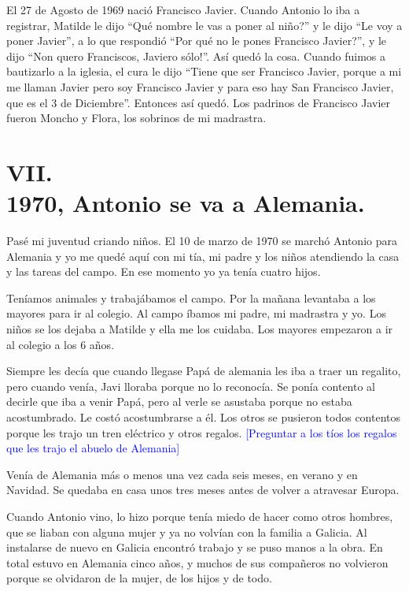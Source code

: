 \documentclass[12pt,a5paper]{book}
\begin{document}
 El 27 de Agosto de 1969 nació Francisco Javier. Cuando Antonio lo iba a registrar, Matilde le dijo ``Qué nombre le vas a poner al niño?'' y le dijo ``Le voy a poner Javier'', a lo que respondió ``Por qué no le pones Francisco Javier?'', y le dijo ``Non quero Franciscos, Javiero sólo!''. Así quedó la cosa. Cuando fuimos a bautizarlo a la iglesia, el cura le dijo ``Tiene que ser Francisco Javier, porque a mi me llaman Javier pero soy Francisco Javier y para eso hay San Francisco Javier, que es el 3 de Diciembre''. Entonces así quedó. Los padrinos de Francisco Javier fueron Moncho y Flora, los sobrinos de mi madrastra.


\section*{VII.\\1970, Antonio se va a Alemania.}

Pasé mi juventud criando niños. El 10 de marzo de 1970 se marchó Antonio para Alemania y yo me quedé aquí con mi tía, mi padre y los niños atendiendo la casa y las tareas del campo. En ese momento yo ya tenía cuatro hijos.

Teníamos animales y trabajábamos el campo. Por la mañana levantaba a los mayores para ir al colegio. Al campo íbamos mi padre, mi madrastra y yo. Los niños se los dejaba a Matilde y ella me los cuidaba. Los mayores empezaron a ir al colegio a los 6 años.

Siempre les decía que cuando llegase Papá de alemania les iba a traer un regalito, pero cuando venía, Javi lloraba porque no lo reconocía. Se ponía contento al decirle que iba a venir Papá, pero al verle se asustaba porque no estaba acostumbrado. Le costó acostumbrarse a él. Los otros se pusieron todos contentos porque les trajo un tren eléctrico y otros regalos. \textcolor{blue}{[Preguntar a los tíos los regalos que les trajo el abuelo de Alemania]} 

Venía de Alemania más o menos una vez cada seis meses, en verano y en Navidad. Se quedaba en casa unos tres meses antes de volver a atravesar Europa.

Cuando Antonio vino, lo hizo porque tenía miedo de hacer como otros hombres, que se liaban con alguna mujer y ya no volvían con la familia a Galicia. Al instalarse de nuevo en Galicia encontró trabajo y se puso manos a la obra. En total estuvo en Alemania cinco años, y muchos de sus compañeros no volvieron porque se olvidaron de la mujer, de los hijos y de todo.
\end{document}
